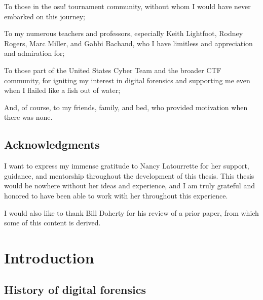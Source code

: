 \documentclass[letterpaper,12pt]{report}
\begin{document}
To those in the osu! tournament community, without whom I would have
never embarked on this journey;

To my numerous teachers and professors, especially Keith Lightfoot,
Rodney Rogers, Marc Miller, and Gabbi Bachand, who I have limitless and
appreciation and admiration for;

To those part of the United States Cyber Team and the broader CTF
community, for igniting my interest in digital forensics and supporting
me even when I flailed like a fish out of water;

And, of course, to my friends, family, and bed, who provided motivation
when there was none.


\newpage

\section*{Acknowledgments}

I want to express my immense gratitude to Nancy Latourrette for her
support, guidance, and mentorship throughout the development of this
thesis. This thesis would be nowhere without her ideas and experience,
and I am truly grateful and honored to have been able to work with her
throughout this experience.

I would also like to thank Bill Doherty for his review of a prior paper,
from which some of this content is derived.


\newpage
\renewcommand*\contentsname{Table of Contents}
\tableofcontents

\newpage
\listoftables

\newpage
\listoffigures

\newpage
\renewcommand{\lstlistlistingname}{List of Code Listings}
\lstlistoflistings

\newpage
{}
\setcounter{page}{1}
\linespread{2}

\chapter{Introduction}\label{chapter-one}

\section{History of digital
forensics}\label{history-of-digital-forensics}
\end{document}
